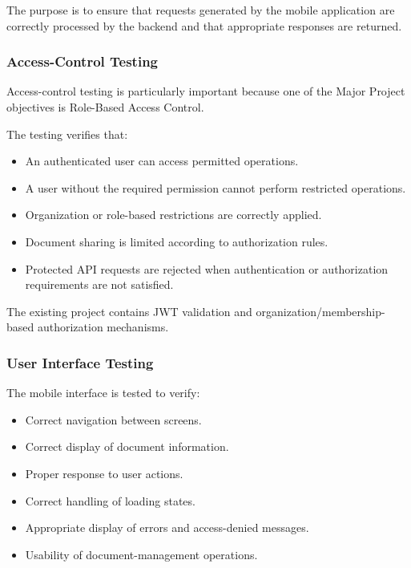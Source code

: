 \documentclass[12pt]{article}
\begin{document}
The purpose is to ensure that requests generated by the mobile application are correctly processed by the backend and that appropriate responses are returned.


\subsubsection{Access-Control Testing}

Access-control testing is particularly important because one of the Major Project objectives is Role-Based Access Control.

The testing verifies that:

\begin{itemize}
    \item An authenticated user can access permitted operations.
    \item A user without the required permission cannot perform restricted operations.
    \item Organization or role-based restrictions are correctly applied.
    \item Document sharing is limited according to authorization rules.
    \item Protected API requests are rejected when authentication or authorization requirements are not satisfied.
\end{itemize}

The existing project contains JWT validation and organization/membership-based authorization mechanisms.


\subsubsection{User Interface Testing}

The mobile interface is tested to verify:

\begin{itemize}
    \item Correct navigation between screens.
    \item Correct display of document information.
    \item Proper response to user actions.
    \item Correct handling of loading states.
    \item Appropriate display of errors and access-denied messages.
    \item Usability of document-management operations.
\end{itemize}
\end{document}
